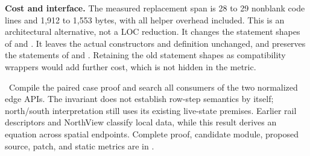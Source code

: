 \textbf{Cost and interface.} The measured replacement span is 28 to 29 nonblank code lines and 1,912 to 1,553 bytes, with all helper overhead included. This is an architectural alternative, not a LOC reduction. It changes the statement shapes of  and . It leaves the actual constructors and  definition unchanged, and preserves the statements of  and . Retaining the old statement shapes as compatibility wrappers would add further cost, which is not hidden in the metric.

\risk\ Compile the paired case proof and search all consumers of the two normalized edge APIs. The invariant does not establish row-step semantics by itself; north/south interpretation still uses its existing live-state premises. Earlier rail descriptors and NorthView classify local data, while this result derives an equation across spatial endpoints. Complete proof, candidate module, proposed source, patch, and static metrics are in .
